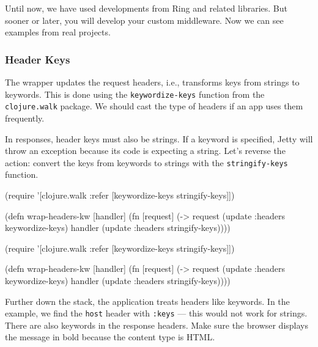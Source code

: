 
Until now, we have used developments from Ring and related libraries. But sooner or later, you will develop your custom middleware. Now we can see examples from real projects.

\subsubsection*{Header Keys}


The wrapper updates the request headers, i.e., transforms keys from strings to keywords. This is done using the \verb|keywordize-keys| function from the \verb|clojure.walk| package. We should cast the type of headers if an app uses them frequently.


In responses, header keys must also be strings. If a keyword is specified, Jetty will throw an exception because its code is expecting a string. Let's reverse the action: convert the keys from keywords to strings with the \verb|stringify-keys| function.


\ifx\DEVICETYPE\MOBILE

\begin{clojure}
(require
 '[clojure.walk :refer [keywordize-keys
                        stringify-keys]])

(defn wrap-headers-kw [handler]
  (fn [request]
    (-> request
        (update :headers keywordize-keys)
        handler
        (update :headers
                stringify-keys))))
\end{clojure}

\else

\begin{clojure}
(require '[clojure.walk :refer
           [keywordize-keys stringify-keys]])

(defn wrap-headers-kw [handler]
  (fn [request]
    (-> request
        (update :headers keywordize-keys)
        handler
        (update :headers stringify-keys))))
\end{clojure}

\fi

Further down the stack, the application treats headers like keywords. In the example, we find the \verb|host| header with \verb|:keys| — this would not work for strings. There are also keywords in the response headers. Make sure the browser displays the message in bold because the content type is HTML.

